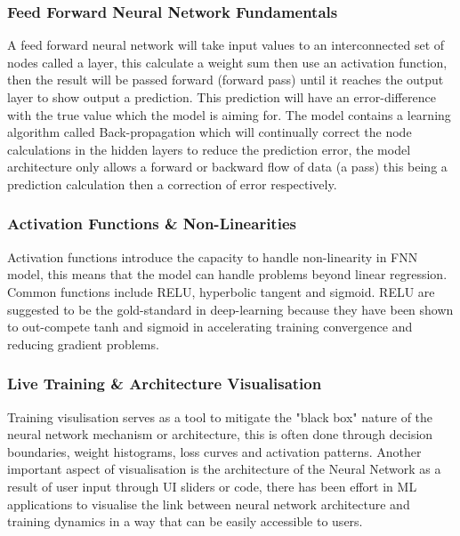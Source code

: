 \documentclass{article}
\begin{document}
\subsubsection{Feed Forward Neural Network Fundamentals}
A feed forward neural network will take input values to an interconnected set of nodes called a layer, this calculate a weight sum then use an activation function, then the result will be passed forward (forward pass) until it reaches the output layer to show output a prediction. This prediction will have an error-difference with the true value which the model is aiming for. The model contains a learning algorithm called Back-propagation which will continually correct the node calculations in the hidden layers to reduce the prediction error, the model architecture only allows a forward or backward flow of data (a pass) this being a prediction calculation then a correction of error respectively.
\subsubsection{Activation Functions \& Non-Linearities}
Activation functions introduce the capacity to handle non-linearity in FNN model, this means that the model can handle problems beyond linear regression. Common functions include RELU, hyperbolic tangent and sigmoid. RELU are suggested to be the gold-standard in deep-learning because they have been shown to out-compete tanh and sigmoid in accelerating training convergence and reducing gradient problems. %
\subsubsection{Live Training \& Architecture  Visualisation}
Training visulisation serves as a tool to mitigate the "black box" nature of the neural network mechanism or architecture, this is often done through decision boundaries, weight histograms, loss curves and activation patterns. Another important aspect of visualisation is the architecture of the Neural Network as a result of user input through UI sliders or code, there has been effort in ML applications to visualise the link between neural network architecture and training dynamics in a way that can be easily accessible to users.
\end{document}
